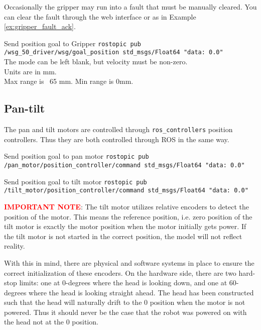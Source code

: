 Occasionally the gripper may run into a fault that must be manually cleared. 
You can clear the fault through the web interface or as in Example \ref{ex:gripper_fault_ack}.

\begin{example}{Send position goal to Gripper}
  \label{ex:gripper_pos_goal}
    \texttt{rostopic pub /wsg\_50\_driver/wsg/goal\_position std\_msgs/Float64 "data: 0.0"} \\
    
    The mode can be left blank, but velocity must be non-zero. \\
    Units are in mm. \\
    Max range is ~65 mm. Min range is 0mm.
\end{example}


\subsection{Pan-tilt}
The pan and tilt motors are controlled through \texttt{ros\_controllers} position controllers. 
Thus they are both controlled through ROS in the same way.

\begin{example}{Send position goal to pan motor}
  \label{ex:pan_pos_goal}
    \texttt{rostopic pub /pan\_motor/position\_controller/command std\_msgs/Float64 "data: 0.0"} \\
\end{example}

\begin{example}{Send position goal to tilt motor}
  \label{ex:tilt_pos_goal}
    \texttt{rostopic pub /tilt\_motor/position\_controller/command std\_msgs/Float64 "data: 0.0"} \\
\end{example}

\textcolor{red}{\textbf{IMPORTANT NOTE}}: The tilt motor utilizes relative encoders to detect the position of the motor. 
This means the reference position, i.e. zero position of the tilt motor is exactly the motor position when the motor initially gets power. 
If the tilt motor is not started in the correct position, the model will not reflect reality.

With this in mind, there are physical and software systems in place to ensure the correct initialization of these encoders.
On the hardware side, there are two hard-stop limits: one at 0-degrees where the head is looking down, and one at 60-degrees where the head is looking straight ahead. 
The head has been constructed such that the head will naturally drift to the 0 position when the motor is not powered. 
Thus it should never be the case that the robot was powered on with the head not at the 0 position.

